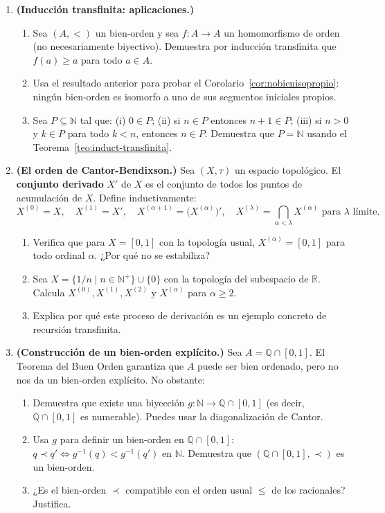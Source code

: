 \begin{enumerate}[leftmargin=2em, label=\textbf{\arabic*.}]
  \item \textbf{(Inducción transfinita: aplicaciones.)}
  \begin{enumerate}[label=(\alph*)]
    \item Sea $(A, <)$ un bien-orden y sea $f: A \to A$ un homomorfismo de orden (no necesariamente biyectivo). Demuestra por inducción transfinita que $f(a) \geq a$ para todo $a \in A$.
    \item Usa el resultado anterior para probar el Corolario~\ref{cor:nobienisopropio}: ningún bien-orden es isomorfo a uno de sus segmentos iniciales propios.
    \item Sea $P \subseteq \mathbb{N}$ tal que: (i) $0 \in P$; (ii) si $n \in P$ entonces $n+1 \in P$; (iii) si $n > 0$ y $k \in P$ para todo $k < n$, entonces $n \in P$. Demuestra que $P = \mathbb{N}$ usando el Teorema~\ref{teo:induct-transfinita}.
  \end{enumerate}

  \item \textbf{(El orden de Cantor-Bendixson.)}
  Sea $(X, \tau)$ un espacio topológico. El \textbf{conjunto derivado} $X'$ de $X$ es el conjunto de todos los puntos de acumulación de $X$. Define inductivamente:
  \[
    X^{(0)} = X, \quad X^{(1)} = X', \quad X^{(\alpha+1)} = \bigl(X^{(\alpha)}\bigr)', \quad X^{(\lambda)} = \bigcap_{\alpha < \lambda} X^{(\alpha)} \text{ para } \lambda \text{ límite.}
  \]
  \begin{enumerate}[label=(\alph*)]
    \item Verifica que para $X = [0,1]$ con la topología usual, $X^{(\alpha)} = [0,1]$ para todo ordinal $\alpha$. ¿Por qué no se estabiliza?
    \item Sea $X = \{1/n \mid n \in \mathbb{N}^+\} \cup \{0\}$ con la topología del subespacio de $\mathbb{R}$. Calcula $X^{(0)}, X^{(1)}, X^{(2)}$ y $X^{(\alpha)}$ para $\alpha \geq 2$.
    \item Explica por qué este proceso de derivación es un ejemplo concreto de recursión transfinita.
  \end{enumerate}

  \item \textbf{(Construcción de un bien-orden explícito.)}
  Sea $A = \mathbb{Q} \cap [0,1]$. El Teorema del Buen Orden garantiza que $A$ puede ser bien ordenado, pero no nos da un bien-orden explícito. No obstante:
  \begin{enumerate}[label=(\alph*)]
    \item Demuestra que existe una biyección $g: \mathbb{N} \to \mathbb{Q} \cap [0,1]$ (es decir, $\mathbb{Q} \cap [0,1]$ es numerable). Puedes usar la diagonalización de Cantor.
    \item Usa $g$ para definir un bien-orden en $\mathbb{Q} \cap [0,1]$: $q \prec q' \iff g^{-1}(q) < g^{-1}(q')$ en $\mathbb{N}$. Demuestra que $(\mathbb{Q} \cap [0,1], \prec)$ es un bien-orden.
    \item ¿Es el bien-orden $\prec$ compatible con el orden usual $\leq$ de los racionales? Justifica.
  \end{enumerate}


\end{enumerate}
